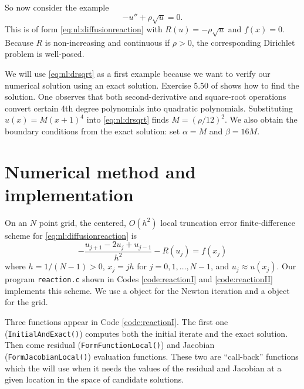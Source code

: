 So now consider the example
\begin{equation}
-u'' + \rho \sqrt{u} = 0. \label{eq:nl:drsqrt}
\end{equation}
This is of form \eqref{eq:nl:diffusionreaction} with $R(u) = - \rho \sqrt{u}$ and $f(x)=0$.  Because $R$ is non-increasing and continuous if $\rho>0$, the corresponding Dirichlet problem is well-posed.

We will use \eqref{eq:nl:drsqrt} as a first example because we want to verify our numerical solution using an exact solution.   Exercise 5.50 of \citet[page 240]{Ockendonetal2003} shows how to find the solution.  One observes that both second-derivative and square-root operations convert certain 4th degree polynomials into quadratic polynomials.  Substituting $u(x)=M(x+1)^4$ into \eqref{eq:nl:drsqrt} finds $M=(\rho/12)^2$.  We also obtain the boundary conditions from the exact solution: set $\alpha=M$ and $\beta=16 M$.


\section{Numerical method and implementation} \label{sec:nl:implementation}

On an $N$ point grid, the centered, $O(h^2)$ local truncation error \citep{MortonMayers2005} finite-difference scheme for \eqref{eq:nl:diffusionreaction} is
\begin{equation}
- \frac{u_{j+1} - 2 u_j + u_{j-1}}{h^2} - R(u_j) = f(x_j)   \label{eq:nl:drfdscheme}
\end{equation}
where $h=1/(N-1)>0$, $x_j = j h$ for $j=0,1,\dots,N-1$, and $u_j \approx u(x_j)$.  Our program \texttt{reaction.c} shown in Codes \ref{code:reactionI} and \ref{code:reactionII} implements this scheme.  We use a \pSNES object for the Newton iteration and a \pDMDA object for the grid.

Three functions appear in Code \ref{code:reactionI}.  The first one (\texttt{InitialAndExact()}) computes both the initial iterate and the exact solution.  Then come residual (\texttt{FormFunctionLocal()}) and Jacobian (\texttt{FormJacobianLocal()}) evaluation functions.  These two are ``call-back'' functions which the \pSNES will use when it needs the values of the residual and Jacobian at a given location in the space of candidate solutions.

